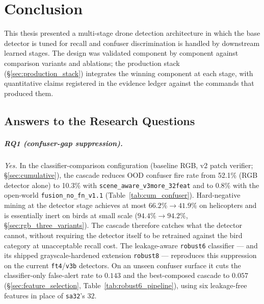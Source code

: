 \chapter{Conclusion}
\label{ch:conclusion}

This thesis presented a multi-stage drone detection architecture in which the base detector is tuned for recall and confuser discrimination is handled by downstream learned stages. The design was validated component by component against comparison variants and ablations; the production stack (\S\ref{sec:production_stack}) integrates the winning component at each stage, with quantitative claims registered in the evidence ledger against the commands that produced them.

\section{Answers to the Research Questions}
\label{sec:rq_answers}

\paragraph{RQ1 (confuser-gap suppression).}
\emph{Yes.} In the classifier-comparison configuration (baseline RGB, v2 patch verifier; \S\ref{sec:cumulative}), the cascade reduces OOD confuser fire rate from 52.1\% (RGB detector alone) to 10.3\% with \texttt{scene\_aware\_v3more\_32feat} and to 0.8\% with the open-world \texttt{fusion\_no\_fn\_v1.1} (Table~\ref{tab:cum_confuser}). Hard-negative mining at the detector stage achieves at most $66.2\% \to 41.9\%$ on helicopters and is essentially inert on birds at small scale ($94.4\% \to 94.2\%$, \S\ref{sec:rgb_three_variants}). The cascade therefore catches what the detector cannot, without requiring the detector itself to be retrained against the bird category at unacceptable recall cost. The leakage-aware \texttt{robust6} classifier --- and its shipped grayscale-hardened extension \texttt{robust8} --- reproduces this suppression on the current \texttt{ft4}/\texttt{v3b} detectors. On an unseen confuser surface it cuts the classifier-only false-alert rate to $0.143$ and the best-composed cascade to $0.057$ (\S\ref{sec:feature_selection}, Table~\ref{tab:robust6_pipeline}), using six leakage-free features in place of \texttt{sa32}'s $32$.

